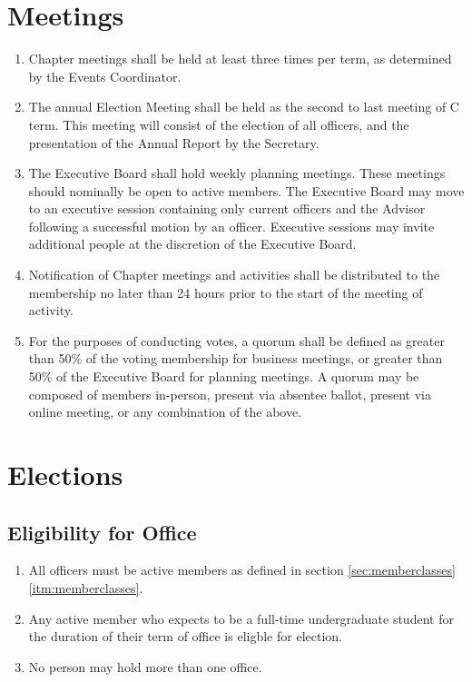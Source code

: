 \documentclass[12pt, letterpaper, oneside]{book}
\begin{document}
\chapter{Meetings}
\begin{enumerate}
    \item Chapter meetings shall be held at least three times per term, as
        determined by the Events Coordinator.
    \item The annual Election Meeting shall be held as the second to last
        meeting of C term. This meeting will consist of the election of all
        officers, and the presentation of the Annual Report by the Secretary.
    \item The Executive Board shall hold weekly planning meetings. These
        meetings should nominally be open to active members.
        \subitem The Executive Board may move to an executive session containing
        only current officers and the Advisor following a successful motion by
        an officer. Executive sessions may invite additional people at the
        discretion of the Executive Board.
    \item Notification of Chapter meetings and activities shall be distributed
        to the membership no later than 24 hours prior to the start of the
        meeting of activity.
    \item For the purposes of conducting votes, a quorum shall be defined as
        greater than 50\% of the voting membership for business meetings, or
        greater than 50\% of the Executive Board for planning meetings. A quorum
        may be composed of members in-person, present via absentee ballot,
        present via online meeting, or any combination of the above.
\end{enumerate}

\chapter{Elections}
\section{Eligibility for Office}
\begin{enumerate}
    \item All officers must be active members as defined in
        section \cref{sec:memberclasses} \cref{itm:memberclasses}.
    \item Any active member who expects to be a full-time undergraduate student
        for the duration of their term of office is eligble for election.
    \item No person may hold more than one office.
\end{enumerate}
\end{document}
